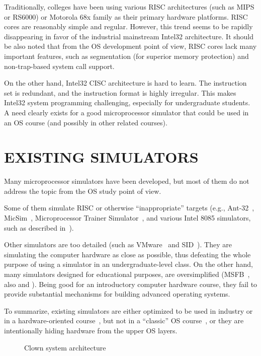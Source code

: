 \documentclass[10pt,twoside]{article}
\begin{document}
Traditionally, colleges have been using various RISC architectures
(such as MIPS or RS6000) or Motorola 68x family as their primary
hardware platforms. RISC cores are reasonably simple and
regular. However, this trend seems to be rapidly disappearing in favor
of the industrial mainstream Intel32 architecture. It should be also
noted that from the OS development point of view, RISC cores lack many
important features, such as segmentation (for superior memory
protection) and non-trap-based system call support.

On the other hand, Intel32 CISC architecture is hard to learn. The
instruction set is redundant, and the instruction format is highly
irregular. This makes Intel32 system programming challenging,
especially for undergraduate students. A need clearly exists for a
good microprocessor simulator that could be used in an OS course (and
possibly in other related courses).

\section{EXISTING SIMULATORS}
Many microprocessor simulators have been developed, but most of them
do not address the topic from the OS study point of view.

Some of them simulate RISC or otherwise ``inappropriate'' targets
(e.g., Ant-32~\cite{ellard02}, MicSim~\cite{merz96}, Microprocessor Trainer
Simulator~\cite{caldwell95}, and various Intel 8085 simulators, such
as described in~\cite{insoluz98}).

Other simulators are too detailed (such as VMware~\cite{vmware} and
SID~\cite{sid01}). They are simulating the computer hardware as close
as possible, thus defeating the whole purpose of using a simulator in
an undergraduate-level class. On the other hand, many simulators
designed for educational purposes, are oversimplified
(MSFB~\cite{bauers}, also \cite{hill94functional} and
\cite{caldwell95}). Being good for an introductory computer hardware
course, they fail to provide substantial mechanisms for building
advanced operating systems.

To summarize, existing simulators are either optimized to be used in
industry or in a hardware-oriented course~\cite{patterson96}, but not
in a ``classic'' OS course~\cite{silberschatz02}, or they are
intentionally hiding hardware from the upper OS layers.

\begin{figure*}[t!]\centering
{}
\caption{\label{system}Clown system architecture}
\end{figure*}
\end{document}
